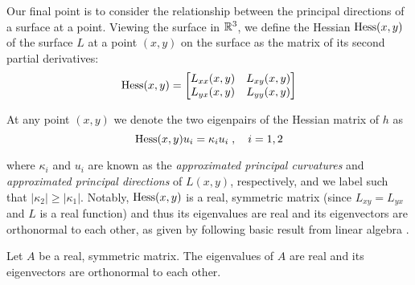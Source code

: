   Our final point is to consider the relationship between the principal directions of a surface at a point. Viewing the surface in $\mathbb{R}^3$, we define the Hessian $\mathrm{Hess}(x,y)$ of the surface $L$
  at a point $(x,y)$ on the surface as the matrix of its second partial derivatives:
  \begin{equation}
  \mathrm{Hess}(x,y) = \begin{bmatrix}
  L_{xx}(x,y) & L_{xy}(x,y) \\
  L_{yx}(x,y) & L_{yy}(x,y)
  \end{bmatrix}
  \end{equation}
  
  At any point $(x,y)$ we denote the two eigenpairs of the Hessian matrix of $h$ as
  \begin{equation}
  \mathrm{Hess}(x,y) u_i = \kappa_i u_i \; , \quad i = 1,2
  \end{equation}

  where $\kappa_i$ and $u_i$ are known as the
  \textit{approximated principal curvatures} and \textit{approximated principal directions} of $L(x,y)$, respectively, and we label such that $|\kappa_2| \ge |\kappa_1|$. Notably, $\mathrm{Hess}(x,y)$ is a real, symmetric matrix (since  $L_{xy} = L_{yx}$ and $L$ is a real function) and thus its eigenvalues are real and its eigenvectors are orthonormal to each other, as given by following basic result from linear algebra
  \cite{burden-faires}.
  
  \begin{lemma}
     	Let $A$ be a real, symmetric matrix. The eigenvalues of $A$ are real and its eigenvectors are orthonormal to each other.
  \end{lemma}
  
